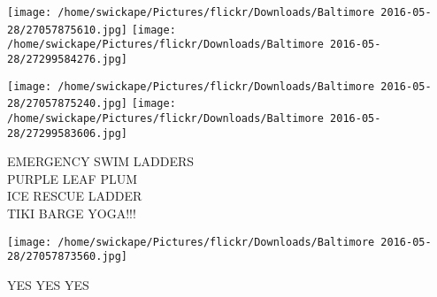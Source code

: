 \documentclass[10pt,letterpaper]{article}
\begin{document}
\texttt{[image: /home/swickape/Pictures/flickr/Downloads/Baltimore 2016-05-28/27057875610.jpg]}
\texttt{[image: /home/swickape/Pictures/flickr/Downloads/Baltimore 2016-05-28/27299584276.jpg]}

\texttt{[image: /home/swickape/Pictures/flickr/Downloads/Baltimore 2016-05-28/27057875240.jpg]}
\texttt{[image: /home/swickape/Pictures/flickr/Downloads/Baltimore 2016-05-28/27299583606.jpg]}

EMERGENCY SWIM LADDERS\\
PURPLE LEAF PLUM\\
ICE RESCUE LADDER\\
TIKI BARGE YOGA!!!\\
\pagebreak

\texttt{[image: /home/swickape/Pictures/flickr/Downloads/Baltimore 2016-05-28/27057873560.jpg]}

YES YES YES\\
\pagebreak
\end{document}
